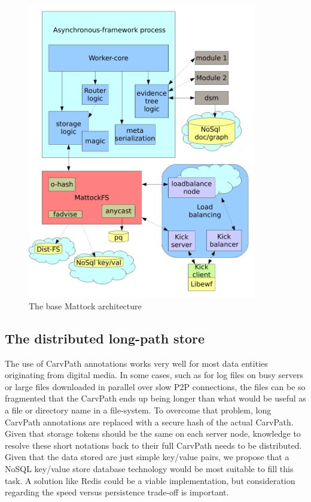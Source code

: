 \begin{figure}
\centering
\includegraphics[width=100mm]{mattock/libraryviewmattock.pdf}
\caption{The base Mattock architecture}
\label{fig:FlowInOut}
\end{figure}
\subsection{The distributed long-path store}
The use of CarvPath annotations works very well for most data entities originating from digital media. In some cases, such as for log files on busy servers or large files downloaded in parallel over slow P2P connections, the files can be so fragmented that the CarvPath ends up being longer than what would be useful as a file or directory name in a file-system. To overcome that problem, long CarvPath annotations are replaced with a secure hash of the actual CarvPath. Given that storage tokens should be the same on each server node, knowledge to resolve these short notations back to their full CarvPath needs to be distributed. Given that the data stored are just simple key/value pairs, we propose that a NoSQL key/value store database technology would be most suitable to fill this task. A solution like Redis could be a viable implementation, but consideration regarding the speed versus persistence trade-off is important.
